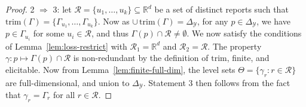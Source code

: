 \documentclass[anon,12pt]{colt2019}
\newcommand{\Comments}{1}
\newcommand{\mytodo}[2]{\ifnum\Comments=1%
  \todo[linecolor=#1!80!black,backgroundcolor=#1,bordercolor=#1!80!black]{#2}\fi}
\newcommand{\jessiet}[1]{\mytodo{purple!20!white}{JF: #1}}
\newcommand{\reals}{\mathbb{R}}
\newcommand{\simplex}{\Delta_\Y}
\newcommand{\R}{\mathcal{R}}
\newcommand{\Y}{\mathcal{Y}}
\newcommand{\trim}{\mathrm{trim}}
\begin{document}
\begin{proof}


  2 $\Rightarrow$ 3: let $\R = \{u_1,\ldots,u_k\} \subseteq\reals^d$ be a set of distinct reports such that $\trim(\Gamma) = \{\Gamma_{u_1},\ldots,\Gamma_{u_k}\}$.
  Now as $\cup\,\trim(\Gamma) = \simplex$, for any $p\in\simplex$, we have $p\in\Gamma_{u_i}$ for some $u_i\in\R$, and thus $\Gamma(p) \cap \R \neq \emptyset$.
  We now satisfy the conditions of Lemma~\ref{lem:loss-restrict} with $\R_1 = \reals^d$ and $\R_2 = \R$.
  The property $\gamma:p\mapsto\Gamma(p)\cap\R$ is non-redundant by the definition of $\trim$, finite, and elicitable.
  Now from Lemma~\ref{lem:finite-full-dim}, the level sets $\Theta = \{\gamma_r:r\in\R\}$ are full-dimensional, and union to $\simplex$.
  Statement 3 then follows from the fact that $\gamma_r = \Gamma_r$ for all $r\in\R$.


\end{proof}
\end{document}
